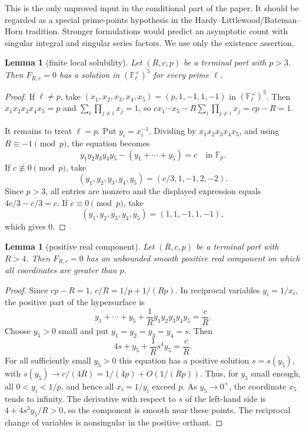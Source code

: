 \documentclass[11pt]{amsart}
\theoremstyle{plain}
\newtheorem{lemma}[theorem]{Lemma}
\theoremstyle{definition}
\theoremstyle{remark}
\begin{document}
This is the only unproved input in the conditional part of the paper.  It should be regarded as a special prime-points hypothesis in the Hardy--Littlewood/Bateman--Horn tradition.  Stronger formulations would predict an asymptotic count with singular integral and singular series factors.  We use only the existence assertion.

\begin{lemma}[finite local solubility]\label{lem:five-local}
Let $(R,c,p)$ be a terminal port with $p>3$.  Then $F_{R,c}=0$ has a solution in $(\mathbb F_\ell^\times)^5$ for every prime $\ell$.
\end{lemma}

\begin{proof}
If $\ell\ne p$, take $(x_1,x_2,x_3,x_4,x_5)=(p,1,-1,1,-1)$ in $(\mathbb F_\ell^\times)^5$.  Then $x_1x_2x_3x_4x_5=p$ and $\sum_i\prod_{j\ne i}x_j=1$, so $c x_1\cdots x_5-R\sum_i\prod_{j\ne i}x_j=cp-R=1$.

It remains to treat $\ell=p$.  Put $y_i=x_i^{-1}$.  Dividing by $x_1x_2x_3x_4x_5$, and using $R\equiv -1\pmod p$, the equation becomes
\[
        y_1y_2y_3y_4y_5-(y_1+\cdots+y_5)=c
        \quad\text{in }\mathbb F_p.
\]
If $c\not\equiv0\pmod p$, take
\[
        (y_1,y_2,y_3,y_4,y_5)=(c/3,1,-1,2,-2).
\]
Since $p>3$, all entries are nonzero and the displayed expression equals $4c/3-c/3=c$.  If $c\equiv0\pmod p$, take
\[
        (y_1,y_2,y_3,y_4,y_5)=(1,1,-1,1,-1),
\]
which gives $0$.
\end{proof}

\begin{lemma}[positive real component]\label{lem:five-real}
Let $(R,c,p)$ be a terminal port with $R>4$.  Then $F_{R,c}=0$ has an unbounded smooth positive real component on which all coordinates are greater than $p$.
\end{lemma}

\begin{proof}
Since $cp-R=1$, $c/R=1/p+1/(Rp)$.  In reciprocal variables $y_i=1/x_i$, the positive part of the hypersurface is
\begin{equation}\label{eq:reciprocal-five}
        y_1+\cdots+y_5+\frac1R y_1y_2y_3y_4y_5=\frac cR.
\end{equation}
Choose $y_5>0$ small and put $y_1=y_2=y_3=y_4=s$.  Then
\[
        4s+y_5+\frac1R s^4y_5=\frac cR.
\]
For all sufficiently small $y_5>0$ this equation has a positive solution $s=s(y_5)$, with $s(y_5)\to c/(4R)=1/(4p)+O(1/(Rp))$.  Thus, for $y_5$ small enough, all $0<y_i<1/p$, and hence all $x_i=1/y_i$ exceed $p$.  As $y_5\to0^+$, the coordinate $x_5$ tends to infinity.  The derivative with respect to $s$ of the left-hand side is $4+4s^3y_5/R>0$, so the component is smooth near these points.  The reciprocal change of variables is nonsingular in the positive orthant.
\end{proof}
\end{document}
